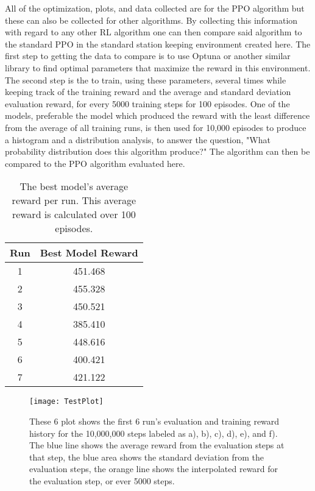 All of the optimization, plots, and data collected are for the PPO algorithm but these can also be collected for other algorithms. By collecting this information with regard to any other RL algorithm one can then compare said algorithm to the standard PPO in the standard station keeping environment created here. The first step to getting the data to compare is to use Optuna or another similar library to find optimal parameters that maximize the reward in this environment. The second step is the to train, using these parameters, several times while keeping track of the training reward and the average and standard deviation evaluation reward, for every 5000 training steps for 100 episodes. One of the models, preferable the model which produced the reward with the least difference from the average of all training runs, is then used for 10,000 episodes to produce a histogram and a distribution analysis, to answer the question, "What probability distribution does this algorithm produce?" The algorithm can then be compared to the PPO algorithm evaluated here.

\begin{table}
	\centering
	\begin{tabular}{|c|c|} \hline
		Run & Best Model Reward \\\hline\hline
		1 & 451.468 \\\hline
		2 & 455.328 \\\hline
		3 & 450.521 \\\hline
		4 & 385.410 \\\hline
		5 & 448.616 \\\hline
		6 & 400.421 \\\hline
		7 & 421.122 \\\hline
	\end{tabular}
	\caption{The best model's average reward per run. This average reward is calculated over 100 episodes.}
	\label{table:best_evaluation_rewards}
\end{table}

\begin{figure}
	\centering
	\texttt{[image: TestPlot]}
	\caption{These 6 plot shows the first 6 run's evaluation and training reward history for the 10,000,000 steps labeled as a), b), c), d), e), and f). The blue line shows the average reward from the evaluation steps at that step, the blue area shows the standard deviation from the evaluation steps, the orange line shows the interpolated reward for the evaluation step, or ever 5000 steps. }
	\label{fig:validation_runs}
\end{figure}

